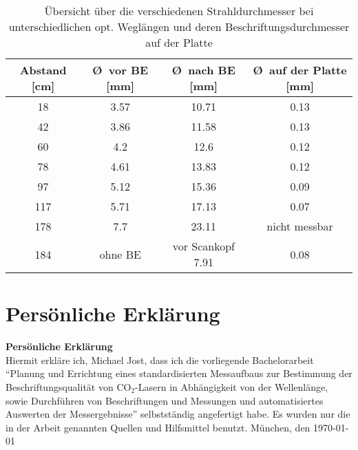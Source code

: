 \documentclass{article}
\begin{document}
\begin{table}[!ht]
\caption{Übersicht über die verschiedenen Strahldurchmesser bei unterschiedlichen opt. Weglängen und deren Beschriftungsdurchmesser auf der Platte}
\begin{tabular}{|c|c|c|c|}
\hline
	Abstand [cm] & \O \ vor BE [mm] & \O \ nach BE [mm] & \O \ auf der Platte [mm]\\
\hline
	18 & 3.57 & 10.71 & 0.13 \\
	42 & 3.86 & 11.58 & 0.13 \\
	60 & 4.2 & 12.6 & 0.12 \\
	78 & 4.61 & 13.83 & 0.12 \\
	97 & 5.12 & 15.36 & 0.09 \\
	117 & 5.71 & 17.13 & 0.07 \\
	178 & 7.7 & 23.11 & nicht messbar \\
\hline
	184 & ohne BE & vor Scankopf 7.91 & 0.08 \\
\hline
\end{tabular}
\label{Strahldurchmessertabelle}
\end{table}

\section{Persönliche Erklärung}
\large \textbf{Persönliche Erklärung}
\\[1em]
Hiermit erkläre ich, Michael Jost, dass ich die vorliegende Bachelorarbeit "`Planung und Errichtung eines standardisierten Messaufbaus zur Bestimmung der Beschriftungsqualität von CO$_2$-Lasern in Abhängigkeit von der Wellenlänge, sowie Durchführen von Beschriftungen und Messungen und automatisiertes Auswerten der Messergebnisse"' selbstständig angefertigt habe. Es wurden nur die in der Arbeit genannten Quellen und Hilfsmittel benutzt.
\vspace{4\baselineskip}
München, den \today 
\newpage
{}
\listoffigures


\end{document}
